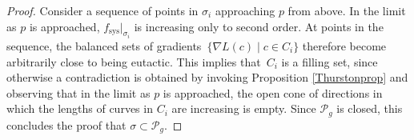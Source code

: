 \begin{proof}
Consider a sequence of points in $\sigma_{i}$ approaching $p$ from above. In the limit as $p$ is approached, $f_{\mathrm{sys}}|_{\sigma_{i}}$ is increasing only to second order. At points in the sequence, the balanced sets of gradients~$\{\nabla L(c) \mid c\in C_{i}\}$ therefore become arbitrarily close to being eutactic. This implies that~$C_{i}$ is a filling set, since otherwise a contradiction is obtained by invoking Proposition \ref{Thurstonprop} and observing that in the limit as $p$ is approached, the open cone of directions in which the lengths of curves in $C_{i}$ are increasing is empty. Since $\mathcal{P}_{g}$ is closed, this concludes the proof that $\sigma\subset \mathcal{P}_{g}$.
\end{proof}
